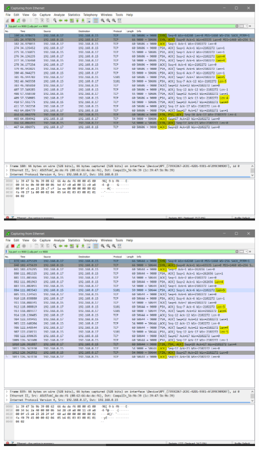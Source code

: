 \vspace{2em}
\begin{minipage}{\textwidth}
    \hspace{-1em}
    \centering
    \includegraphics[scale=.3]{prints/wireshark-nio.PNG}
    \label{threadspng}
    \hspace{1em}
\end{minipage}
\vspace{0.5em}

\vspace{2em}
\begin{minipage}{\textwidth}
    \hspace{-1em}
    \centering
    \includegraphics[scale=.3]{prints/wireshark-fork.PNG}
    \label{threadspng}
    \hspace{1em}
\end{minipage}
\vspace{0.5em}

